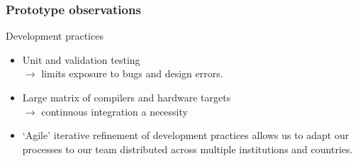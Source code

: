 \documentclass[aspectratio=43,12pt]{beamer}
\newcommand{\subheading}[1]{{\large #1}}
\begin{document}
\begin{frame}
\frametitle{Prototype observations}
\subheading{Development practices}

\vfill
\begin{itemize}
\item Unit and validation testing\\
\hspace{5mm} $\to$ limits exposure to bugs and design errors.
\item Large matrix of compilers and hardware targets\\
\hspace{5mm} $\to$ continuous integration a necessity\\
\item `Agile' iterative refinement of development practices allows us
to adapt our processes to our team distributed across multiple institutions and countries.
\end{itemize}

\vfill
\end{frame}
\end{document}
